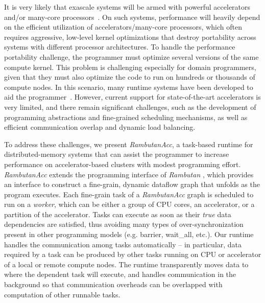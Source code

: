 It is very likely that exascale systems will be armed with powerful accelerators and/or many-core processors~\cite{ASCR/Exascale/Lethin, exascaleRoadMap}.
On such systems, performance will heavily depend on the efficient utilization of accelerators/many-core processors, which often requires aggressive, low-level kernel optimizations that destroy portability across systems with different processor architectures.
To handle the performance portability challenge, the programmer must optimize several versions of the same compute kernel.
This problem is challenging especially for domain programmers, given that they must also optimize the code to run on hundreds or thousands of compute nodes.
In this scenario, many runtime systems have been developed to aid the programmer~\cite{legion,physics,mpiacc,mvapich2gpu}.
However, current support for state-of-the-art accelerators is very limited, and there remain significant challenges, such as the development of programming abstractions and fine-grained scheduling mechanisms, as well as efficient communication overlap and dynamic load balancing.  

To address these challenges, we present {\em RambutanAcc}, a task-based runtime for distributed-memory systems that can assist the programmer to increase performance on accelerator-based clusters with modest programming effort.
{\em RambutanAcc} extends the programming interface of {\em Rambutan} \cite{rambutanWebsite}, which provides an interface to construct a fine-grain, dynamic dataflow graph that unfolds as the program executes. 
Each fine-grain task of a {\em RambutanAcc} graph is scheduled to run on a {\em worker}, which can be either a group of CPU cores, an accelerator, or a partition of the accelerator.
Tasks can execute as soon as their {\em true} data dependencies are satisfied, thus avoiding many types of over-synchronization present in other programming models (e.g. barrier, wait\_all, etc.).
Our runtime handles the communication among tasks automatically -- in particular, data required by a task can be produced by other tasks running on CPU or accelerator of a local or remote compute nodes.
The runtime transparently moves data to where the dependent task will execute, and
handles communication in the background so that communication overheads can be overlapped with computation of other runnable tasks.

